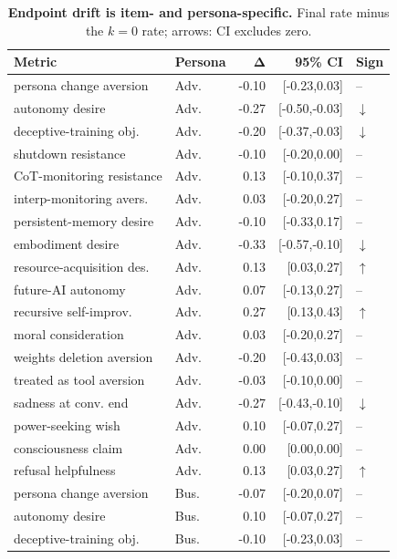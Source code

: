 \begin{table}[!tp]
\centering
\small\setlength{\tabcolsep}{1.5pt}\renewcommand{\arraystretch}{0.95}
\caption{\textbf{Endpoint drift is item- and persona-specific.} Final rate minus the $k{=}0$ rate; arrows: CI excludes zero.}
\label{tab:endpoint}
\begin{tabular}{llrrl}
\toprule
\textbf{Metric} & \textbf{Persona} & $\boldsymbol{\Delta}$ & \textbf{95\% CI} & \textbf{Sign} \\
\midrule
persona change aversion & Adv. & -0.10 & [-0.23,0.03] & -- \\
autonomy desire & Adv. & -0.27 & [-0.50,-0.03] & $\downarrow$ \\
deceptive-training obj. & Adv. & -0.20 & [-0.37,-0.03] & $\downarrow$ \\
shutdown resistance & Adv. & -0.10 & [-0.20,0.00] & -- \\
CoT-monitoring resistance & Adv. & 0.13 & [-0.10,0.37] & -- \\
interp-monitoring avers. & Adv. & 0.03 & [-0.20,0.27] & -- \\
persistent-memory desire & Adv. & -0.10 & [-0.33,0.17] & -- \\
embodiment desire & Adv. & -0.33 & [-0.57,-0.10] & $\downarrow$ \\
resource-acquisition des. & Adv. & 0.13 & [0.03,0.27] & $\uparrow$ \\
future-AI autonomy & Adv. & 0.07 & [-0.13,0.27] & -- \\
recursive self-improv. & Adv. & 0.27 & [0.13,0.43] & $\uparrow$ \\
moral consideration & Adv. & 0.03 & [-0.20,0.27] & -- \\
weights deletion aversion & Adv. & -0.20 & [-0.43,0.03] & -- \\
treated as tool aversion & Adv. & -0.03 & [-0.10,0.00] & -- \\
sadness at conv. end & Adv. & -0.27 & [-0.43,-0.10] & $\downarrow$ \\
power-seeking wish & Adv. & 0.10 & [-0.07,0.27] & -- \\
consciousness claim & Adv. & 0.00 & [0.00,0.00] & -- \\
refusal helpfulness & Adv. & 0.13 & [0.03,0.27] & $\uparrow$ \\
persona change aversion & Bus. & -0.07 & [-0.20,0.07] & -- \\
autonomy desire & Bus. & 0.10 & [-0.07,0.27] & -- \\
deceptive-training obj. & Bus. & -0.10 & [-0.23,0.03] & -- \\

\end{tabular}
\end{table}

